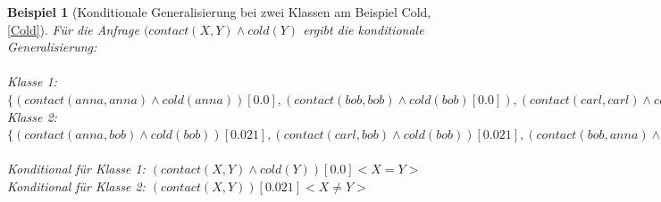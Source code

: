 \documentclass[a4paper, 11pt]{book}
\newtheorem{Bsp}{Beispiel}[section]
\begin{document}
\begin{itemize}
\begin{itemize}
		\begin{Bsp}[Konditionale Generalisierung bei zwei Klassen am Beispiel Cold, \ref{Cold}]
			Für die Anfrage $ (contact(X,Y) \land cold(Y) $ ergibt die konditionale Generalisierung:\\
			\\
		Klasse 1: $ \{ (contact(anna,anna) \land cold(anna))[0.0], (contact(bob,bob) \land cold(bob)[0.0]), (contact(carl,carl)\land cold(carl))[0.0]\} $\\
		Klasse 2: $ \{(contact(anna,bob) \land cold(bob))[0.021] , (contact(carl, bob) \land cold(bob))[0.021] , (contact(bob, anna) \land cold(anna))[0.021], (contact(anna, carl)\land cold(carl)) [0.021], (contact(bob, carl)\land cold(carl)) [0.021], (contact(carl, anna) \land cold(anna))[0.021] \} $\\
		\\
		Konditional für Klasse 1: $ (contact(X,Y) \land cold(Y))[0.0] <X = Y> $\\
		Konditional für Klasse 2: $ (contact(X,Y))[0.021] <X \neq Y> $\\
		\end{Bsp}
	\end{itemize}
\end{itemize}
\end{document}
